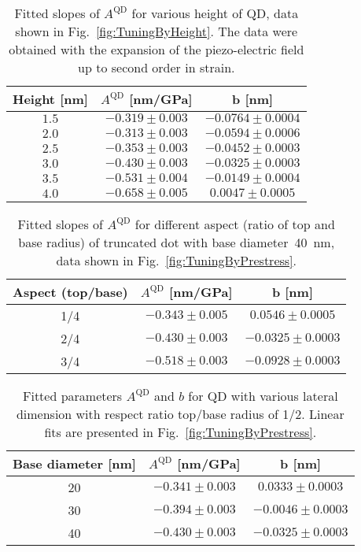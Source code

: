  		\begin{table}[ht!]
 			\centering
 			\caption{Fitted slopes of $A^{\mathrm{QD}}$ for various height of QD, data shown in Fig.~\ref{fig:TuningByHeight}. The data were obtained with the expansion of the piezo-electric field up to second order in strain.}
 			\label{tab:height_slopes}
 			\begin{tabular}{|c|c|c|}
 				\hline
 				Height [nm]		& $A^{\mathrm{QD}}$ [nm/GPa]    & b   [nm]    \\ \hline
 			 $1.5$  &$-0.319 \pm 0.003$  & $-0.0764 \pm 0.0004$     \\ \hline
 			$2.0$	&$-0.313 \pm 0.003$  & $-0.0594 \pm 0.0006$      \\ \hline
 			 $2.5$  &$-0.353 \pm 0.003$  & $-0.0452\pm 0.0003$     \\ \hline
 			 $3.0$	&$-0.430 \pm 0.003$  & $-0.0325 \pm 0.0003$      \\ \hline
 			 $3.5$  &$-0.531 \pm 0.004$  & $-0.0149\pm 0.0004$     \\ \hline
 			 $4.0$	&$-0.658 \pm 0.005$  & $0.0047 \pm 0.0005$      \\ \hline
 			\end{tabular}    
 		\end{table}
 		


 		
 		
 		
 		\begin{table}[ht!]
 			\centering
 			\caption{Fitted slopes of $A^{\mathrm{QD}}$ for different aspect (ratio of top and base radius) of truncated dot with base diameter~40~nm, data shown in Fig.~\ref{fig:TuningByPrestress}.}
 			\label{tab:aspect_slopes}
 			\begin{tabular}{|c|c|c|}
 				\hline
 				Aspect (top/base) 	& $A^{\mathrm{QD}}$ [nm/GPa]    & b   [nm]    \\ \hline
 				1/4	&$-0.343\pm0.005$ &	$0.0546	\pm	0.0005$\\ \hline
 				2/4	&$-0.430\pm0.003$ &	$-0.0325 \pm		0.0003$\\ \hline
 				3/4	&$-0.518\pm0.003$ &	$-0.0928	\pm 0.0003$\\ \hline
 			\end{tabular}    
 		\end{table}
 		
 		\begin{table}[ht!]
 			\centering
 			\caption{Fitted parameters $A^{\mathrm{QD}}$ and $b$ for QD with various lateral dimension with respect ratio top/base radius of 1/2. Linear fits are presented in Fig.~\ref{fig:TuningByPrestress}.}
 			\label{tab:lateral_slopes}
 			\begin{tabular}{|c|c|c|}
 				\hline
 				Base diameter [nm]	& $A^{\mathrm{QD}}$ [nm/GPa]    & b   [nm]    \\ \hline
			20&	$-0.341\pm0.003$&	$0.0333\pm		0.0003$\\ \hline
			30&	$-0.394\pm0.003$&	$-0.0046\pm	0.0003$\\ \hline
			40&	$-0.430\pm0.003$&	$-0.0325	\pm	0.0003$ \\ \hline
 			\end{tabular}    
 		\end{table}
 		
